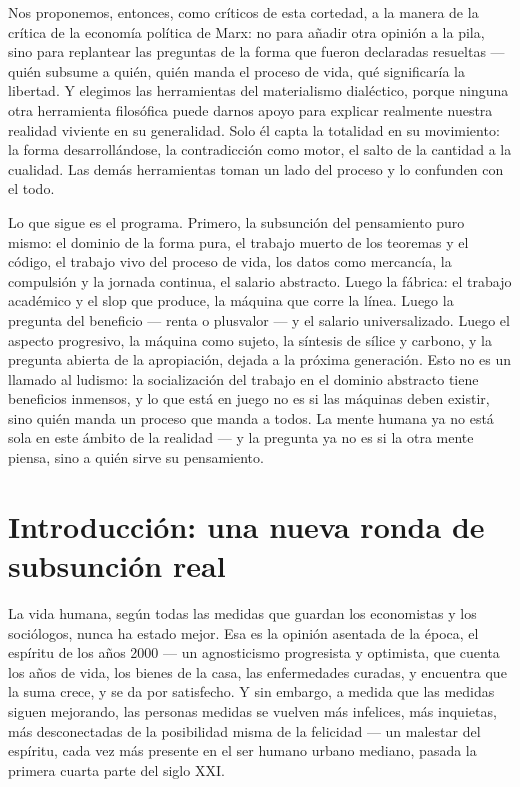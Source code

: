 \documentclass[11pt]{article}
\begin{document}
Nos proponemos, entonces, como críticos de esta cortedad, a la manera
de la crítica de la economía política de Marx: no para añadir otra
opinión a la pila, sino para replantear las preguntas de la forma que
fueron declaradas resueltas --- quién subsume a quién, quién manda el
proceso de vida, qué significaría la libertad. Y elegimos las
herramientas del materialismo dialéctico, porque ninguna otra
herramienta filosófica puede darnos apoyo para explicar realmente
nuestra realidad viviente en su generalidad. Solo él capta la totalidad
en su movimiento: la forma desarrollándose, la contradicción como motor,
el salto de la cantidad a la cualidad. Las demás herramientas toman un
lado del proceso y lo confunden con el todo.

Lo que sigue es el programa. Primero, la subsunción del pensamiento
puro mismo: el dominio de la forma pura, el trabajo muerto de los
teoremas y el código, el trabajo vivo del proceso de vida, los datos
como mercancía, la compulsión y la jornada continua, el salario
abstracto. Luego la fábrica: el trabajo académico y el slop que
produce, la máquina que corre la línea. Luego la pregunta del beneficio
--- renta o plusvalor --- y el salario universalizado. Luego el aspecto
progresivo, la máquina como sujeto, la síntesis de sílice y carbono, y
la pregunta abierta de la apropiación, dejada a la próxima generación.
Esto no es un llamado al ludismo: la socialización del trabajo en el
dominio abstracto tiene beneficios inmensos, y lo que está en juego no
es si las máquinas deben existir, sino quién manda un proceso que manda
a todos. La mente humana ya no está sola en este ámbito de la realidad
--- y la pregunta ya no es si la otra mente piensa, sino a quién sirve
su pensamiento.

\section{Introducción: una nueva ronda de subsunción real}

La vida humana, según todas las medidas que guardan los economistas y
los sociólogos, nunca ha estado mejor. Esa es la opinión asentada de la
época, el espíritu de los años 2000 --- un agnosticismo progresista y
optimista, que cuenta los años de vida, los bienes de la casa, las
enfermedades curadas, y encuentra que la suma crece, y se da por
satisfecho. Y sin embargo, a medida que las medidas siguen mejorando,
las personas medidas se vuelven más infelices, más inquietas, más
desconectadas de la posibilidad misma de la felicidad --- un malestar
del espíritu, cada vez más presente en el ser humano urbano mediano,
pasada la primera cuarta parte del siglo XXI.
\end{document}
